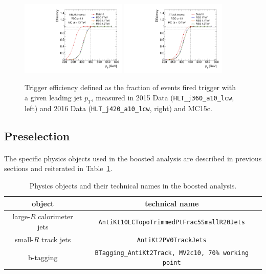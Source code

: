 \begin{figure}[htbp!]
\begin{center}
\includegraphics[angle=270, width=0.45\textwidth]{./figures/boosted/Trigger/trig_15_b77_pT_Efficiency.pdf}
\includegraphics[angle=270, width=0.45\textwidth]{./figures/boosted/Trigger/trig_16_b77_pT_Efficiency.pdf}
  \caption{Trigger efficiency defined as the fraction of events fired trigger with a given leading jet $p_{T}$, measured in 2015 Data (\texttt{HLT\_j360\_a10\_lcw}, left) and 2016 Data (\texttt{HLT\_j420\_a10\_lcw}, right) and MC15c.}
  \label{fig:boosted-trigger-HLT-turnon}
\end{center}
\end{figure}

\subsection{Preselection}
\paragraph{}
The specific physics objects used in the boosted analysis are described in previous sections and reiterated in Table~\ref{tab:boosted-objects}.

\begin{table}[bhp]
\begin{center}
\begin{tabular}{c|c}
  object & technical name \\
  \hline
  large-$R$ calorimeter jets & \texttt{AntiKt10LCTopoTrimmedPtFrac5SmallR20Jets} \\
  small-$R$ track jets       & \texttt{AntiKt2PV0TrackJets} \\
  b-tagging                  & \texttt{BTagging\_AntiKt2Track, MV2c10, 70\% working point} \\
\end{tabular}
\caption{Physics objects and their technical names in the boosted analysis.} %
\label{tab:boosted-objects}
\end{center}
\end{table}


